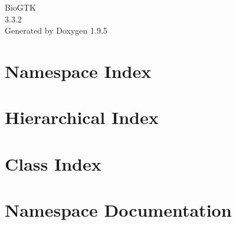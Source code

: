 \documentclass[twoside]{book}
\newcommand{\+}{\discretionary{\mbox{\scriptsize$\hookleftarrow$}}{}{}}
\newcommand{\clearemptydoublepage}{%
    \newpage{\pagestyle{empty}\cleardoublepage}%
  }
\begin{document}
  \raggedbottom
    \hypersetup{pageanchor=false,
                bookmarksnumbered=true,
                pdfencoding=unicode
               }
  \begin{titlepage}
  \vspace*{7cm}
  \begin{center}%
  {\Large Bio\+GTK}\\
  [1ex]\large 3.\+3.\+2 \\
  \vspace*{1cm}
  {\large Generated by Doxygen 1.9.5}\\
  \end{center}
  \end{titlepage}
  \clearemptydoublepage
  \tableofcontents
  \clearemptydoublepage
  \hypersetup{pageanchor=true}
\chapter{Namespace Index}

\chapter{Hierarchical Index}

\chapter{Class Index}

\chapter{Namespace Documentation}



\end{document}

